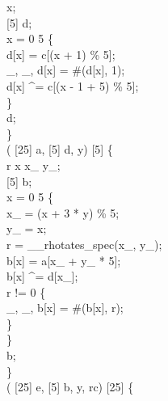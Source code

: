  x;\\
 [5] d;\\
 x = 0  5 \{\\
d[x] = c[(x + 1) \% 5];\\
_, _, d[x] = \#(d[x], 1);\\
d[x] \textasciicircum{}= c[(x - 1 + 5) \% 5];\\
\}\\
 d;\\
\}\\
  ( [25] a,  [5] d,   y) \jasminarrow{}  [5] \{\\
  r x x_ y_;\\
 [5] b;\\
 x = 0  5 \{\\
x_ = (x + 3 * y) \% 5;\\
y_ = x;\\
r = __rhotates_spec(x_, y_);\\
b[x] = a[x_ + y_ * 5];\\
b[x] \textasciicircum{}= d[x_];\\
 r != 0 \{\\
_, _, b[x] = \#(b[x], r);\\
\}\\
\}\\
 b;\\
\}\\
  ( [25] e,  [5] b,   y,   rc) \jasminarrow{}  [25] \{\\
